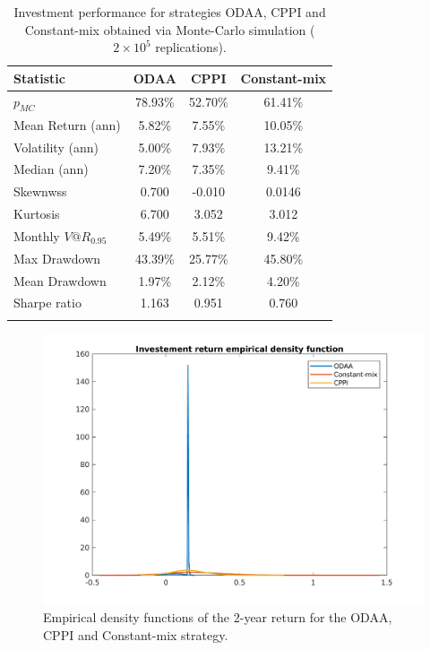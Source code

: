 \begin{table}[]
	\centering
	\begin{tabular}{@{}lccc@{}} \toprule
		Statistic & ODAA & CPPI & Constant-mix \\ \midrule
		$p_{MC}$ &  78.93\%    &  52.70\%    &  61.41\%    \\
		\addlinespace[0.5em]
		Mean Return (ann) & 5.82\%  & 7.55\% & 10.05\%\\
		\addlinespace[0.5em]
		Volatility (ann) & 5.00\%  & 7.93\% & 13.21\% \\
		\addlinespace[0.5em]
		Median (ann) &	7.20\% & 7.35\% & 9.41\% \\
		\addlinespace[0.5em]
		Skewnwss & 0.700 & -0.010 & 0.0146 \\
		\addlinespace[0.5em]
		Kurtosis & 6.700 & 3.052 & 3.012 \\
		\addlinespace[0.5em]
		Monthly $V@R_{0.95}$ & 5.49\% & 5.51\% & 9.42\%\\
		\addlinespace[0.5em]
		Max Drawdown & 43.39\% & 25.77\% & 45.80\% \\
		\addlinespace[0.5em]
		Mean Drawdown & 1.97\% & 2.12\% & 4.20\% \\
		\addlinespace[0.5em]
		Sharpe ratio & 1.163 & 0.951 & 0.760 \\ \bottomrule
		\addlinespace[0.5em]
	\end{tabular}
	\caption{Investment performance for strategies ODAA, CPPI and Constant-mix obtained via Monte-Carlo simulation ($2\times 10^5$ replications).}
	\label{tab:MC_statistics}
\end{table}



\begin{figure}[]
	\includegraphics[scale = 0.6]{Images/DensitiesMixturewk}
	\caption{Empirical density functions of the 2-year return for the ODAA, CPPI and Constant-mix strategy.}
	\label{fig:epirical_densities}
\end{figure}
